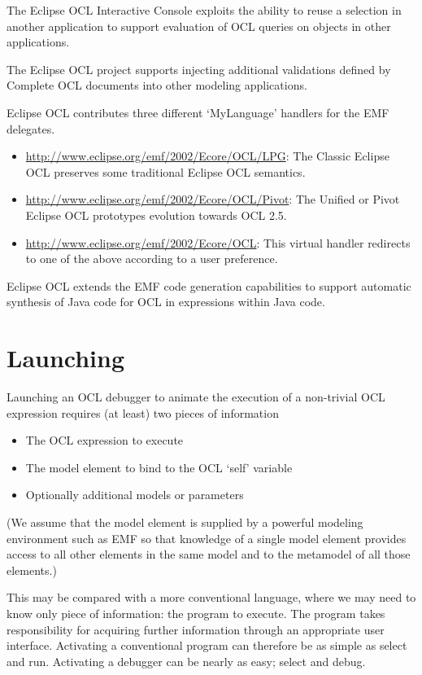 \documentclass[a4paper]{article}
\begin{document}
The Eclipse OCL Interactive Console exploits the ability to reuse a selection in another application to support evaluation of OCL queries on objects in other applications.

The Eclipse OCL project supports injecting additional validations defined by Complete OCL documents into other modeling applications.

Eclipse OCL contributes three different `MyLanguage' handlers for the EMF delegates.

\begin{itemize}
\item \url{http://www.eclipse.org/emf/2002/Ecore/OCL/LPG}: The Classic Eclipse OCL preserves some traditional Eclipse OCL semantics.
\item \url{http://www.eclipse.org/emf/2002/Ecore/OCL/Pivot}: The Unified or Pivot Eclipse OCL prototypes evolution towards OCL 2.5.
\item \url{http://www.eclipse.org/emf/2002/Ecore/OCL}: This virtual handler redirects to one of the above according to a user preference.
\end{itemize}

Eclipse OCL extends the EMF code generation capabilities to support automatic synthesis of Java code for OCL in expressions within Java code.
 
\section{Launching}\label{Launching}

Launching an OCL debugger to animate the execution of a non-trivial OCL expression requires (at least) two pieces of information
\begin{itemize}
\item The OCL expression to execute
\item The model element to bind to the OCL `self' variable
\item Optionally additional models or parameters
\end{itemize}

(We assume that the model element is supplied by a powerful modeling environment such as EMF so that knowledge of a single model element provides access to all other elements in the same model and to the metamodel of all those elements.) 

This may be compared with a more conventional language, where we may need to know only piece of information: the program to execute. The program takes responsibility for acquiring further information through an appropriate user interface. Activating a conventional program can therefore be as simple as select and run. Activating a debugger can be nearly as easy; select and debug.
\end{document}
